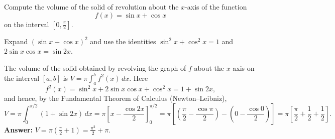 
\begin{question}
Compute the volume of the solid of revolution about the $x$-axis of the function
\[ f(x) = \sin x + \cos x \]
on the interval $[0, \frac{\pi}{2}]$.
\end{question}

\begin{hint}
Expand $(\sin x + \cos x)^2$ and use the identities $\sin^2 x + \cos^2 x = 1$ and $2\sin x\cos x = \sin 2x$.
\end{hint}

\begin{solution}
The volume of the solid obtained by revolving the graph of $f$ about the $x$-axis on the interval $[a,b]$ is $V = \pi\int_a^b f^2(x)\,dx$. Here
\[ f^2(x) = \sin^2 x + 2\sin x\cos x + \cos^2 x = 1 + \sin 2x, \]
and hence, by the Fundamental Theorem of Calculus (Newton--Leibniz),
\[ V = \pi\int_0^{\pi/2} (1 + \sin 2x)\,dx = \pi\left[ x - \frac{\cos 2x}{2} \right]_0^{\pi/2}
     = \pi\left[ \left(\frac{\pi}{2} - \frac{\cos\pi}{2}\right) - \left(0 - \frac{\cos 0}{2}\right) \right]
     = \pi\left[ \frac{\pi}{2} + \frac12 + \frac12 \right]. \]
\textbf{Answer:} $\boxed{V = \pi\left(\frac{\pi}{2} + 1\right) = \frac{\pi^2}{2} + \pi}$.
\end{solution}
